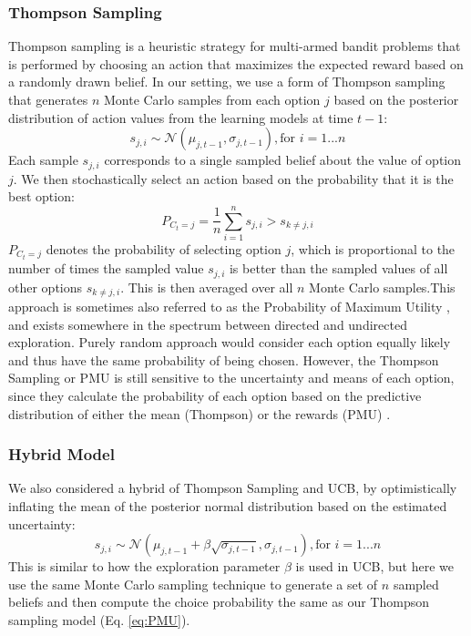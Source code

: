 \subsubsection{Thompson Sampling}
Thompson \citeyear{thompson1933likelihood} sampling is a heuristic strategy for multi-armed bandit problems that is performed by choosing an action that maximizes the expected reward based on a randomly drawn belief. In our setting, we use a form of Thompson sampling that generates $n$ Monte Carlo samples from each option $j$ based on the posterior distribution of action values from the learning models at time $t-1$:
\begin{equation}
    s_{j,i} \sim \mathcal{N}(\mu_{j,t-1},\sigma_{j, t-1}), \text{for } i = 1... n
\end{equation}
Each sample $s_{j,i}$ corresponds to a single sampled belief about the value of option $j$. We then stochastically select an action based on the probability that it is the best option:
\begin{equation}
    P_{C_{t}=j}=\frac{1}{n}\sum_{i=1}^{n} s_{j,i}>s_{k\neq j,i}
    \label{eq:PMU}
\end{equation}
$P_{C_{t}=j}$ denotes the probability of selecting option $j$, which is proportional to the number of times the sampled value $s_{j,i}$ is better than the sampled values of all other options $s_{k\neq j,i}$. This is then averaged over all $n$ Monte Carlo samples.This approach is sometimes also referred to as the Probability of Maximum Utility \citep{speekenbrink2015uncertainty, wu2018generalization}, and exists somewhere in the spectrum between directed and undirected exploration. Purely random approach would consider each option equally likely and thus have the same probability of being chosen. However, the Thompson Sampling or PMU is still sensitive to the uncertainty and means of each option, since they calculate the probability of each option based on the predictive distribution of either the mean (Thompson) or the rewards (PMU) \citep{schulz2017putting}.

\subsubsection{Hybrid Model}
We also considered a hybrid of Thompson Sampling and UCB, by optimistically inflating the mean of the posterior normal distribution based on the estimated uncertainty:
\begin{equation}
    s_{j,i} \sim \mathcal{N}(\mu_{j,t-1} + \beta\sqrt{\sigma_{j, t-1}},\sigma_{j, t-1}), \text{for } i = 1... n
\end{equation}
This is similar to how the exploration parameter $\beta$ is used in UCB, but here we use the same Monte Carlo sampling technique to generate a set of $n$ sampled beliefs and then compute the choice probability the same as our Thompson sampling model (Eq. \ref{eq:PMU}).




